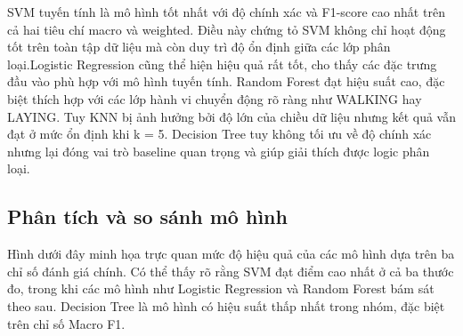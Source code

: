 \documentclass[
]{article}
\begin{document}
SVM tuyến tính là mô hình tốt nhất với độ chính xác và F1-score cao nhất
trên cả hai tiêu chí macro và weighted. Điều này chứng tỏ SVM không chỉ
hoạt động tốt trên toàn tập dữ liệu mà còn duy trì độ ổn định giữa các
lớp phân loại.Logistic Regression cũng thể hiện hiệu quả rất tốt, cho
thấy các đặc trưng đầu vào phù hợp với mô hình tuyến tính. Random Forest
đạt hiệu suất cao, đặc biệt thích hợp với các lớp hành vi chuyển động rõ
ràng như WALKING hay LAYING. Tuy KNN bị ảnh hưởng bởi độ lớn của chiều
dữ liệu nhưng kết quả vẫn đạt ở mức ổn định khi k = 5. Decision Tree tuy
không tối ưu về độ chính xác nhưng lại đóng vai trò baseline quan trọng
và giúp giải thích được logic phân loại.

\subsection{Phân tích và so sánh mô
hình}\label{phuxe2n-tuxedch-vuxe0-so-suxe1nh-muxf4-huxecnh}

Hình dưới đây minh họa trực quan mức độ hiệu quả của các mô hình dựa
trên ba chỉ số đánh giá chính. Có thể thấy rõ rằng SVM đạt điểm cao nhất
ở cả ba thước đo, trong khi các mô hình như Logistic Regression và
Random Forest bám sát theo sau. Decision Tree là mô hình có hiệu suất
thấp nhất trong nhóm, đặc biệt trên chỉ số Macro F1.
\end{document}
